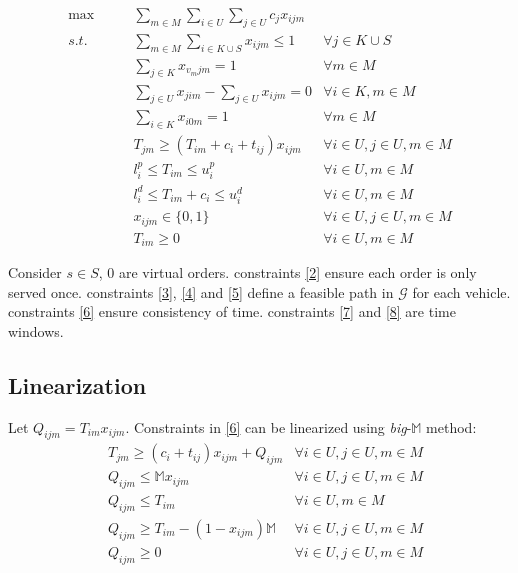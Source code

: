 \documentclass[a4paper]{article}
\begin{document}
\begin{align}
 \max\qquad & \sum_{m\in M}\sum_{i\in U}\sum_{j\in U} c_j x_{ijm} \label{obj}                                            \\
 s.t.\qquad & \sum_{m\in M}\sum_{i\in K\cup S} x_{ijm} \leqslant 1                  & \forall j \in K\cup S  \label{2}         \\
            & \sum_{j \in K} x_{v_{m}jm} = 1                                  & \forall m\in M \label{3}                 \\
            & \sum_{j \in U} x_{jim} - \sum_{j \in U} x_{ijm}=0               & \forall i \in
 K, m\in M \label{4}                                                                                                     \\
            & \sum_{i\in K} x_{i0m} = 1                                       & \forall m\in M \label{5}                 \\
            & T_{jm} \geqslant (T_{im}+c_i+t_{ij})x_{ijm}                     & \forall i\in U, j\in U,m\in M \label{6}  \\
            & l_i^p \leqslant T_{im} \leqslant u_i^p                          & \forall i \in U,m\in M \label{7}         \\
            & l_i^d \leqslant T_{im}+c_i \leqslant u_i^d                      & \forall i \in U,m\in M \label{8}         \\
            & x_{ijm}\in \{0,1\}                                              & \forall i\in U, j\in U, m\in M \label{9} \\
            & T_{im} \geqslant 0                                              & \forall i\in U, m\in M \label{10}
\end{align}

 Consider $s\in S$, $0$ are virtual orders. constraints \eqref{2} ensure each order is only served once. constraints \eqref{3}, \eqref{4} and \eqref{5} define a feasible path in $\mathcal{G}$ for each vehicle. constraints \eqref{6} ensure consistency of time. constraints \eqref{7} and \eqref{8} are time windows.
\subsection{Linearization}

Let $Q_{ijm} = T_{im}x_{ijm}$. Constraints in \eqref{6} can be linearized using \textit{big}-$\mathbb{M}$ method:\\
\begin{align}
  & T_{jm} \geqslant (c_i+t_{ij})x_{ijm}+Q_{ijm} &\forall i\in U, j\in U,m\in M \label{11}\\
  & Q_{ijm} \leqslant \mathbb{M} x_{ijm} &\forall i\in U, j\in U,m\in M \label{12}\\
  & Q_{ijm} \leqslant T_{im} &\forall i\in U,m\in M \label{13}\\
  & Q_{ijm} \geqslant T_{im} - (1-x_{ijm})\mathbb{M} &\forall i\in U, j\in U,m\in M \label{14}\\
  & Q_{ijm} \geqslant 0 &\forall i\in U, j\in U,m\in M \label{15}
\end{align}
\end{document}
